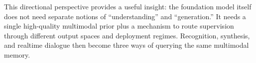 This directional perspective provides a useful insight: the foundation model itself does not need separate notions of ``understanding'' and ``generation.'' It needs a single high-quality multimodal prior plus a mechanism to route supervision through different output spaces and deployment regimes. Recognition, synthesis, and realtime dialogue then become three ways of querying the same multimodal memory.
